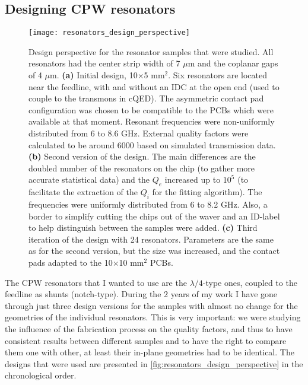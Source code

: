 \documentclass[12pt, twoside]{report}
\numberwithin{equation}{section}
\begin{document}
\subsection{Designing CPW resonators}

\begin{figure}[t]
\texttt{[image: resonators\_design\_perspective]}
\caption{Design perspective for the resonator samples that were studied. All resonators had the center strip width of 7 $\mu$m and the coplanar gaps of 4 $\mu$m. \textbf{(a)} Initial design, 10$\times$5 mm$^2$. Six resonators are located near the feedline, with and without an IDC at the open end (used to couple to the transmons in cQED). The asymmetric contact pad configuration was chosen to be compatible to the PCBs which were available at that moment. Resonant frequencies were non-uniformly distributed from 6 to 8.6 GHz. External quality factors were calculated to be around 6000 based on simulated transmission data. \textbf{(b)} Second version of the design. The main differences are the doubled number of the resonators on the chip (to gather more accurate statistical data) and the $Q_e$ increased up to $10^{5}$ (to facilitate the extraction of the $Q_i$ for the fitting algorithm). The frequencies were uniformly distributed from 6 to 8.2 GHz. Also, a border to simplify cutting the chips out of the waver and an ID-label to help distinguish between the samples were added. \textbf{(c)} Third iteration of the design with 24 resonators. Parameters are the same as for the second version, but the size was increased, and the contact pads adapted to the 10$\times$10 mm$^2$ PCBs.}
\label{fig:resonators_design_perspective}
\end{figure}

The CPW resonators that I wanted to use are the $\lambda/4$-type ones, coupled to the feedline as shunts (notch-type). During the 2 years of my work I have gone through just three design versions for the samples with almost no change for the geometries of the individual resonators. This is very important: we were studying the influence of the fabrication process on the quality factors, and thus to have consistent results between different samples and to have the right to compare them one with other, at least their in-plane geometries had to be identical. The designs that were used are presented in \autoref{fig:resonators_design_perspective} in the chronological order. 
\end{document}
